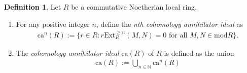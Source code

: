 \documentclass[12pt]{amsart}
\newcommand{\Ext}{\mathrm{Ext}}
\newcommand\ca{\mathrm{ca}}
\newcommand{\module}{\mathrm{mod}}
\theoremstyle{definition}
\newtheorem{definition}[theorem]{Definition}
\numberwithin{equation}{theorem}
\begin{document}
\begin{definition}\label{definition-cohomology-annihilator}
    Let $R$ be a commutative Noetherian local ring.
    \begin{enumerate}
        \item For any positive integer $n$, define the \textit{nth cohomology annihilator ideal} as
        \begin{align*}
        \ca^n(R):= \{r \in R \colon r \Ext_R^{\geq n}(M,N) = 0 \text{ for all } M,N \in \module R\}.
        \end{align*}
        \item The \textit{cohomology annihilator ideal} $\ca(R)$ of $R$ is defined as the union 
        \begin{align*}
            \ca(R) := \bigcup_{n \in \mathbb{N} } \ca^n(R)
        \end{align*}    
    \end{enumerate}
\end{definition}
\end{document}
